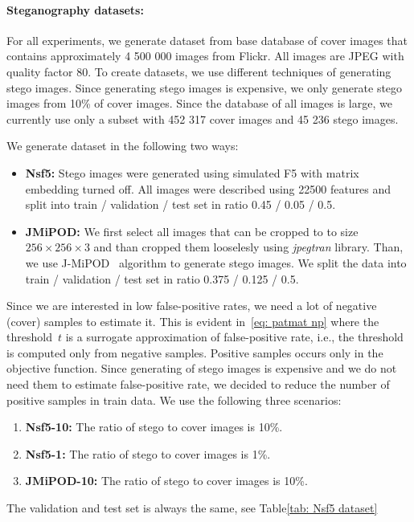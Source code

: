 \paragraph*{Steganography datasets:}

For all experiments, we generate dataset from base database of cover images that contains approximately 4 500 000 images from Flickr. All images are JPEG with quality factor 80. To create datasets, we use different techniques of generating stego images. Since generating stego images is expensive, we only generate stego images from 10\% of cover images. Since the database of all images is large, we currently use only a subset with 452 317 cover images and 45 236 stego images.

We generate dataset in the following two ways:
\begin{itemize}
  \item \textbf{Nsf5:} Stego images were generated using simulated F5 with matrix embedding turned off. All images were described using 22500 features and split into train / validation / test set in ratio 0.45 / 0.05 / 0.5.
  \item  \textbf{JMiPOD:} We first select all images that can be cropped to to size $256 \times 256 \times 3$ and than cropped them looselesly using \emph{jpegtran} library. Than, we use J-MiPOD~\cite{cogranne2020steganography} algorithm to generate stego images. We split the data into train / validation / test set in ratio 0.375 / 0.125 / 0.5.
\end{itemize}

Since we are interested in low false-positive rates, we need a lot of negative (cover) samples to estimate it. This is evident in~\eqref{eq: patmat np} where the threshold~$t$ is a surrogate approximation of false-positive rate, i.e., the threshold is computed only from negative samples. Positive samples occurs only in the objective function. Since generating of stego images is expensive and we do not need them to estimate false-positive rate, we decided to reduce the number of positive samples in train data. We use the following three scenarios:
\begin{enumerate}
  \item \textbf{Nsf5-10:} The ratio of stego to cover images is 10\%.
  \item \textbf{Nsf5-1:} The ratio of stego to cover images is 1\%.
  \item \textbf{JMiPOD-10:} The ratio of stego to cover images is 10\%.
\end{enumerate}
The validation and test set is always the same, see Table\ref{tab: Nsf5 dataset}

